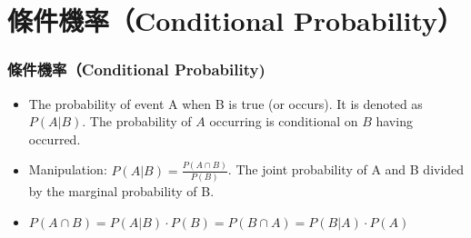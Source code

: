 \documentclass{beamer}
\begin{document}
\section{條件機率（Conditional Probability）}
\begin{frame}\frametitle{條件機率（Conditional Probability)}
\begin{itemize}
\item The probability of event A when B is true (or occurs). It is denoted as $P(A|B)$. The probability of $A$ occurring is conditional on $B$ having occurred.
\item Manipulation: $P(A|B)=\frac{P(A\cap B)}{P(B)}$. The joint probability of A and B divided by the marginal probability of B.
\item $P(A\cap B)=P(A|B)\cdot P(B)=P(B\cap A)=P(B|A)\cdot P(A)$
\end{itemize}
\end{frame}
\end{document}
